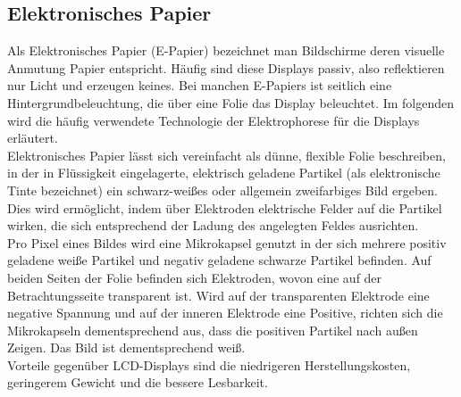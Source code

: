 \subsection{Elektronisches Papier}
Als Elektronisches Papier (E-Papier) bezeichnet man Bildschirme deren visuelle Anmutung Papier entspricht. Häufig sind diese Displays passiv, also reflektieren nur Licht und erzeugen keines. Bei manchen E-Papiers ist seitlich eine Hintergrundbeleuchtung, die über eine Folie das Display beleuchtet. Im folgenden wird die häufig verwendete Technologie der Elektrophorese für die Displays erläutert. \\
\glqq Elektronisches Papier lässt sich vereinfacht als dünne, flexible Folie beschreiben, in der in Flüssigkeit eingelagerte, elektrisch geladene Partikel (als elektronische Tinte bezeichnet) ein schwarz-weißes oder allgemein zweifarbiges Bild ergeben. Dies wird ermöglicht, indem über Elektroden elektrische Felder auf die Partikel wirken, die sich entsprechend der Ladung des angelegten Feldes ausrichten. \grqq \cite[Seite 568]{Schryen.2002} \\
Pro Pixel eines Bildes wird eine Mikrokapsel genutzt in der sich mehrere positiv geladene weiße Partikel und negativ geladene schwarze Partikel befinden. Auf beiden Seiten der Folie befinden sich Elektroden, wovon eine auf der Betrachtungsseite transparent ist. Wird auf der transparenten Elektrode eine negative Spannung und auf der inneren Elektrode eine Positive, richten sich die Mikrokapseln dementsprechend aus, dass die positiven Partikel nach außen Zeigen. Das Bild ist dementsprechend weiß. \cite[Vgl. Seite 567 f.]{Schryen.2002} \\
Vorteile gegenüber LCD-Displays sind die niedrigeren Herstellungskosten, geringerem Gewicht und die bessere Lesbarkeit. \cite[Vgl. Seite 569]{Schryen.2002}